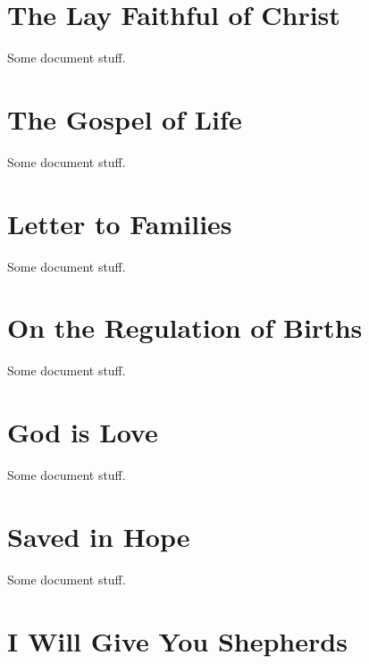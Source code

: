 \documentclass[oneside]{book}
\begin{document}
\chapter{The Lay Faithful of Christ}

Some document stuff.


\chapter{The Gospel of Life}

Some document stuff.


\chapter{Letter to Families}

Some document stuff.


\chapter{On the Regulation of Births}

Some document stuff.


\chapter{God is Love}

Some document stuff.


\chapter{Saved in Hope}

Some document stuff.


\chapter{I Will Give You Shepherds}
\end{document}
